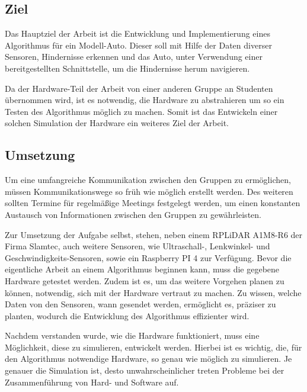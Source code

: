 \subsection{Ziel}
Das Hauptziel der Arbeit ist die Entwicklung und Implementierung eines Algorithmus für ein Modell-Auto. Dieser soll mit Hilfe der Daten diverser Sensoren, Hindernisse
erkennen und das Auto, unter Verwendung einer bereitgestellten Schnittstelle, um die Hindernisse herum navigieren.


Da der Hardware-Teil der Arbeit von einer anderen Gruppe an Studenten übernommen wird, ist es notwendig, die Hardware zu abstrahieren um so ein Testen des Algorithmus möglich zu machen. Somit ist das Entwickeln einer solchen Simulation der Hardware ein weiteres Ziel der Arbeit.

\subsection{Umsetzung}
Um eine umfangreiche Kommunikation zwischen den Gruppen zu ermöglichen, müssen Kommunikationswege so früh wie möglich erstellt werden. Des weiteren sollten Termine für regelmäßige Meetings festgelegt werden, um einen konstanten Austausch von Informationen zwischen den Gruppen zu gewährleisten.

Zur Umsetzung der Aufgabe selbst, stehen, neben einem RPLiDAR A1M8-R6 der Firma Slamtec, auch weitere Sensoren, wie Ultraschall-, Lenkwinkel- und Geschwindigkeits-Sensoren, sowie ein Raspberry PI 4 zur Verfügung.
Bevor die eigentliche Arbeit an einem Algorithmus beginnen kann, muss die gegebene Hardware getestet werden. Zudem ist es, um das weitere Vorgehen planen zu können, notwendig, sich mit der Hardware vertraut zu machen. Zu wissen, welche Daten von den Sensoren, wann gesendet werden, ermöglicht es, präziser zu planten, wodurch die Entwicklung des Algorithmus effizienter wird.

Nachdem verstanden wurde, wie die Hardware funktioniert, muss eine Möglichkeit, diese zu simulieren, entwickelt werden. Hierbei ist es wichtig, die, für den Algorithmus notwendige Hardware, so genau wie möglich zu simulieren. Je genauer die Simulation ist, desto unwahrscheinlicher treten Probleme bei der Zusammenführung von Hard- und Software auf.


\newpage
